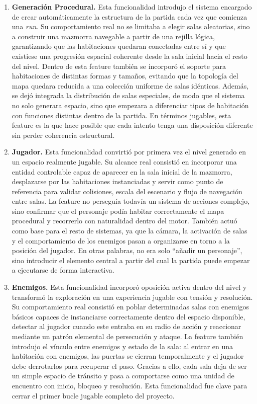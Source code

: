 \begin{enumerate}
\item \textbf{Generación Procedural.} Esta funcionalidad introdujo el sistema encargado de
crear automáticamente la estructura de la partida cada vez que comienza una \textit{run}.
Su comportamiento real no se limitaba a elegir salas aleatorias, sino a construir una
mazmorra navegable a partir de una rejilla lógica, garantizando que las habitaciones
quedaran conectadas entre sí y que existiese una progresión espacial coherente desde la
sala inicial hacia el resto del nivel. Dentro de esta feature también se incorporó el
soporte para habitaciones de distintas formas y tamaños, evitando que la topología del mapa
quedara reducida a una colección uniforme de salas idénticas. Además, se dejó integrada la
distribución de salas especiales, de modo que el sistema no solo generara espacio, sino que
empezara a diferenciar tipos de habitación con funciones distintas dentro de la partida.
En términos jugables, esta feature es la que hace posible que cada intento tenga una
disposición diferente sin perder coherencia estructural.

\item \textbf{Jugador.} Esta funcionalidad convirtió por primera vez el nivel
generado en un espacio realmente jugable. Su alcance real consistió en incorporar una
entidad controlable capaz de aparecer en la sala inicial de la mazmorra, desplazarse por
las habitaciones instanciadas y servir como punto de referencia para validar colisiones,
escala del escenario y flujo de navegación entre salas. La feature no perseguía todavía un
sistema de acciones complejo, sino confirmar que el personaje podía habitar correctamente
el mapa procedural y recorrerlo con naturalidad dentro del motor. También actuó como base
para el resto de sistemas, ya que la cámara, la activación de salas y el comportamiento de
los enemigos pasan a organizarse en torno a la posición del jugador. En otras palabras, no
era solo ``añadir un personaje'', sino introducir el elemento central a partir del cual la
partida puede empezar a ejecutarse de forma interactiva.

\item \textbf{Enemigos.} Esta funcionalidad incorporó oposición activa dentro del
nivel y transformó la exploración en una experiencia jugable con tensión y resolución. Su
comportamiento real consistió en poblar determinadas salas con enemigos básicos capaces de
instanciarse correctamente dentro del espacio disponible, detectar al jugador cuando este
entraba en su radio de acción y reaccionar mediante un patrón elemental de persecución y
ataque. La feature también introdujo el vínculo entre enemigos y estado de la sala: al
entrar en una habitación con enemigos, las puertas se cierran temporalmente y el jugador
debe derrotarlos para recuperar el paso. Gracias a ello, cada sala deja de ser un simple
espacio de tránsito y pasa a comportarse como una unidad de encuentro con inicio, bloqueo y
resolución. Esta funcionalidad fue clave para cerrar el primer bucle jugable completo del
proyecto.

\end{enumerate}

